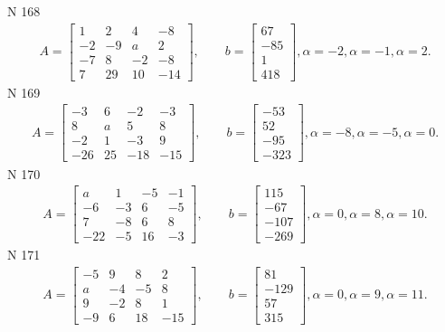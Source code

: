 \documentclass[11pt]{report}
\begin{document}
N 168
\begin{align*}
 A = \left[\begin{matrix}1 & 2 & 4 & -8\\-2 & -9 & a & 2\\-7 & 8 & -2 & -8\\7 & 29 & 10 & -14\end{matrix}\right],
    \qquad b = \left[\begin{matrix}67\\-85\\1\\418\end{matrix}\right], \alpha = -2, \alpha = -1, \alpha = 2. 
 \end{align*}
N 169
\begin{align*}
 A = \left[\begin{matrix}-3 & 6 & -2 & -3\\8 & a & 5 & 8\\-2 & 1 & -3 & 9\\-26 & 25 & -18 & -15\end{matrix}\right],
    \qquad b = \left[\begin{matrix}-53\\52\\-95\\-323\end{matrix}\right], \alpha = -8, \alpha = -5, \alpha = 0. 
 \end{align*}
N 170
\begin{align*}
 A = \left[\begin{matrix}a & 1 & -5 & -1\\-6 & -3 & 6 & -5\\7 & -8 & 6 & 8\\-22 & -5 & 16 & -3\end{matrix}\right],
    \qquad b = \left[\begin{matrix}115\\-67\\-107\\-269\end{matrix}\right], \alpha = 0, \alpha = 8, \alpha = 10. 
 \end{align*}
N 171
\begin{align*}
 A = \left[\begin{matrix}-5 & 9 & 8 & 2\\a & -4 & -5 & 8\\9 & -2 & 8 & 1\\-9 & 6 & 18 & -15\end{matrix}\right],
    \qquad b = \left[\begin{matrix}81\\-129\\57\\315\end{matrix}\right], \alpha = 0, \alpha = 9, \alpha = 11. 
 \end{align*}
\end{document}
